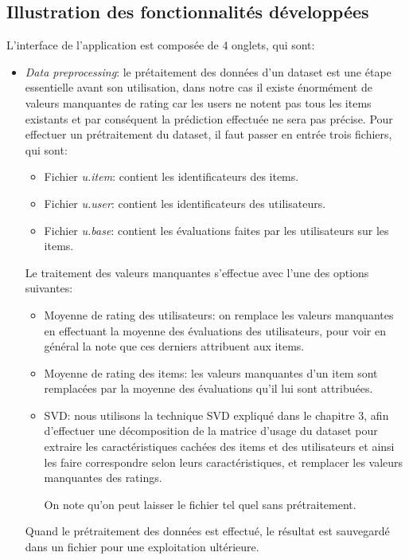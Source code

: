 \subsection{Illustration des fonctionnalités développées}
L'interface de l'application est composée de 4 onglets, qui sont:
\begin{itemize}
	\item\textit{Data preprocessing}: le prétaitement des données d'un dataset est une étape essentielle avant son utilisation, dans notre cas il existe énormément de valeurs manquantes de rating  car les users ne notent pas tous les items existants et par conséquent la prédiction effectuée ne sera pas précise.
	Pour effectuer un prétraitement du dataset, il faut passer en entrée trois fichiers, qui sont: 
	\begin{itemize}
		\item Fichier \textit{u.item}: contient les identificateurs des items.
		\item Fichier \textit{u.user}: contient les identificateurs des utilisateurs.
		\item Fichier \textit{u.base}: contient les évaluations faites par les utilisateurs sur les items.
	\end{itemize}
	Le traitement des valeurs manquantes s'effectue avec l'une des options suivantes:
	\begin{itemize}
		\item Moyenne de rating des utilisateurs: on remplace les valeurs manquantes en effectuant la moyenne des évaluations des utilisateurs, pour voir en général la note que ces derniers attribuent aux items.
		
		\item Moyenne de rating des items: les valeurs manquantes d'un item sont remplacées par la moyenne des évaluations qu'il lui sont attribuées.
		
		\item SVD: nous utilisons la technique SVD expliqué dans le chapitre 3, afin d'effectuer une décomposition de la matrice d'usage du dataset pour extraire les caractéristiques cachées des items et des utilisateurs et ainsi les faire correspondre selon leurs caractéristiques, et remplacer les valeurs manquantes des ratings.
		
		On note qu'on peut laisser le fichier tel quel sans prétraitement.
	\end{itemize}

Quand le prétraitement des données est effectué, le résultat est sauvegardé dans un fichier pour une exploitation ultérieure.



\end{itemize}
